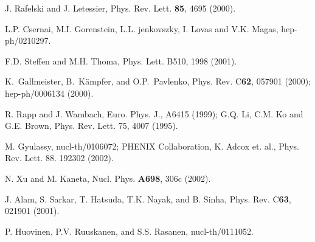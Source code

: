 \begin{thebibliography}{00}
 J. Rafelski and J. Letessier, Phys. Rev. Lett. {\bf 85},
                  4695 (2000).

 L.P. Csernai, M.I. Gorenstein, L.L. jenkovszky, 
                        I. Lovas and V.K. Magas, hep-ph/0210297.

 F.D. Steffen and M.H. Thoma, Phys. Lett. B510, 
                  1998 (2001).
                  
 K.\ Gallmeister, B.\ K\"ampfer, and O.P.\ Pavlenko, 
            Phys. Rev. C{\bf 62}, 057901 (2000); hep-ph/0006134 (2000).

 R. Rapp and J. Wambach, Euro. Phys. J., A6415 (1999);
           G.Q. Li, C.M. Ko and G.E. Brown, Phys. Rev. Lett. 75,
           4007 (1995).

 M. Gyulassy, nucl-th/0106072; PHENIX Collaboration, 
           K. Adcox et. al., Phys. Rev. Lett. 88. 192302 (2002).

 N. Xu and M. Kaneta, Nucl. Phys. {\bf A698}, 306c (2002).

 J. Alam, S. Sarkar, T. Hatsuda, T.K. Nayak, and B. Sinha,
              Phys. Rev. C{\bf 63}, 021901 (2001).

 P. Huovinen, P.V. Ruuskanen, and S.S. Rasanen, nucl-th/0111052.
                
\end{thebibliography}











